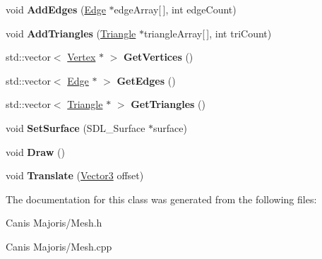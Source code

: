\begin{DoxyCompactItemize}
\item 
\hypertarget{class_core_1_1_renderer_1_1_core_utils_1_1_mesh_a50bbe85261a193782c55fadc7e8ca08d}{void {\bfseries Add\+Edges} (\hyperlink{class_core_1_1_renderer_1_1_core_utils_1_1_edge}{Edge} $\ast$edge\+Array\mbox{[}$\,$\mbox{]}, int edge\+Count)}\label{class_core_1_1_renderer_1_1_core_utils_1_1_mesh_a50bbe85261a193782c55fadc7e8ca08d}

\item 
\hypertarget{class_core_1_1_renderer_1_1_core_utils_1_1_mesh_a105ee441d1f80f30848311ce0ceeb8b5}{void {\bfseries Add\+Triangles} (\hyperlink{class_core_1_1_renderer_1_1_core_utils_1_1_triangle}{Triangle} $\ast$triangle\+Array\mbox{[}$\,$\mbox{]}, int tri\+Count)}\label{class_core_1_1_renderer_1_1_core_utils_1_1_mesh_a105ee441d1f80f30848311ce0ceeb8b5}

\item 
\hypertarget{class_core_1_1_renderer_1_1_core_utils_1_1_mesh_acde340cf2971c199591e8f652e957468}{std\+::vector$<$ \hyperlink{class_core_1_1_renderer_1_1_core_utils_1_1_vertex}{Vertex} $\ast$ $>$ {\bfseries Get\+Vertices} ()}\label{class_core_1_1_renderer_1_1_core_utils_1_1_mesh_acde340cf2971c199591e8f652e957468}

\item 
\hypertarget{class_core_1_1_renderer_1_1_core_utils_1_1_mesh_ac017138cd0f6aff0148ab43b9b18b9ce}{std\+::vector$<$ \hyperlink{class_core_1_1_renderer_1_1_core_utils_1_1_edge}{Edge} $\ast$ $>$ {\bfseries Get\+Edges} ()}\label{class_core_1_1_renderer_1_1_core_utils_1_1_mesh_ac017138cd0f6aff0148ab43b9b18b9ce}

\item 
\hypertarget{class_core_1_1_renderer_1_1_core_utils_1_1_mesh_ab94999e60951477b6bb3e49323e0a5de}{std\+::vector$<$ \hyperlink{class_core_1_1_renderer_1_1_core_utils_1_1_triangle}{Triangle} $\ast$ $>$ {\bfseries Get\+Triangles} ()}\label{class_core_1_1_renderer_1_1_core_utils_1_1_mesh_ab94999e60951477b6bb3e49323e0a5de}

\item 
\hypertarget{class_core_1_1_renderer_1_1_core_utils_1_1_mesh_a05a211cf173818a8479f59a5061bad13}{void {\bfseries Set\+Surface} (S\+D\+L\+\_\+\+Surface $\ast$surface)}\label{class_core_1_1_renderer_1_1_core_utils_1_1_mesh_a05a211cf173818a8479f59a5061bad13}

\item 
\hypertarget{class_core_1_1_renderer_1_1_core_utils_1_1_mesh_ad213fbfe7814ed788b042fdd00feb3be}{void {\bfseries Draw} ()}\label{class_core_1_1_renderer_1_1_core_utils_1_1_mesh_ad213fbfe7814ed788b042fdd00feb3be}

\item 
\hypertarget{class_core_1_1_renderer_1_1_core_utils_1_1_mesh_a6a5ed14e02b0233903e6a3e32c44d9eb}{void {\bfseries Translate} (\hyperlink{class_vector3}{Vector3} offset)}\label{class_core_1_1_renderer_1_1_core_utils_1_1_mesh_a6a5ed14e02b0233903e6a3e32c44d9eb}

\end{DoxyCompactItemize}


The documentation for this class was generated from the following files\+:\begin{DoxyCompactItemize}
\item 
Canis Majoris/Mesh.\+h\item 
Canis Majoris/Mesh.\+cpp\end{DoxyCompactItemize}
